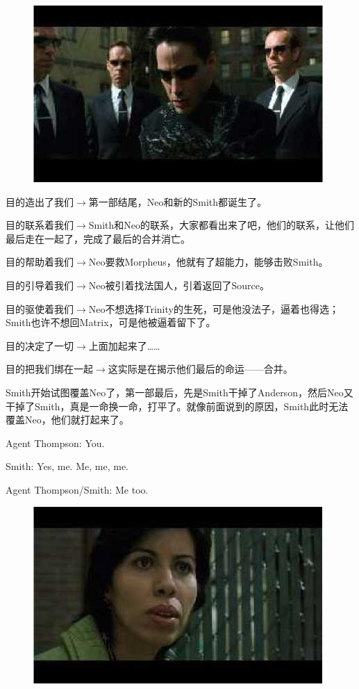 \documentclass{ctexart}
\newenvironment{myquote}{\color{green} \setlength{\leftskip}{6em} \setlength{\rightskip}{4em} \setlength{\parindent}{-2em}}{\par}
\begin{document}
\begin{figure}[htb]
\centering
\includegraphics[width=0.5\linewidth]{fig/read_reloaded-73}
\end{figure}

目的造出了我们$\rightarrow$第一部结尾，Neo和新的Smith都诞生了。

目的联系着我们$\rightarrow$Smith和Neo的联系，大家都看出来了吧，他们的联系，让他们最后走在一起了，完成了最后的合并消亡。

目的帮助着我们$\rightarrow$Neo要救Morpheus，他就有了超能力，能够击败Smith。

目的引导着我们$\rightarrow$Neo被引着找法国人，引着返回了Source。

目的驱使着我们$\rightarrow$Neo不想选择Trinity的生死，可是他没法子，逼着也得选；Smith也许不想回Matrix，可是他被逼着留下了。

目的决定了一切$\rightarrow$上面加起来了……

目的把我们绑在一起$\rightarrow$这实际是在揭示他们最后的命运——合并。

Smith开始试图覆盖Neo了，第一部最后，先是Smith干掉了Anderson，然后Neo又干掉了Smith，真是一命换一命，打平了。就像前面说到的原因，Smith此时无法覆盖Neo，他们就打起来了。

\begin{myquote}
Agent Thompson: You.

Smith: Yes, me. Me, me, me.

Agent Thompson/Smith: Me too.
\end{myquote}

\begin{figure}[htb]
\centering
\includegraphics[width=0.5\linewidth]{fig/read_reloaded-75}
\end{figure}
\end{document}
